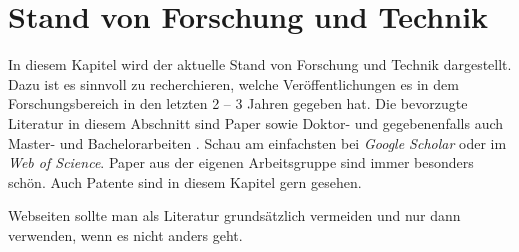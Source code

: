 


\section{Stand von Forschung und Technik}

In diesem Kapitel wird der aktuelle Stand von Forschung und Technik dargestellt. Dazu ist es sinnvoll zu recherchieren, welche Veröffentlichungen es in dem Forschungsbereich in den letzten 2 -- 3 Jahren gegeben hat. Die bevorzugte Literatur in diesem Abschnitt sind Paper \cite{Peters2017,Peters2018,Bruggeman2013} sowie Doktor- und gegebenenfalls auch Master- und Bachelorarbeiten \cite{Hirschberg2017,Freier2013}. Schau am einfachsten bei \textit{Google Scholar} oder im \textit{Web of Science}. Paper aus der eigenen Arbeitsgruppe sind immer besonders schön. Auch Patente \cite{Liepack2011} sind in diesem Kapitel gern gesehen. 

Webseiten \cite{Northstar2018} sollte man als Literatur grundsätzlich vermeiden und nur dann verwenden, wenn es nicht anders geht.








